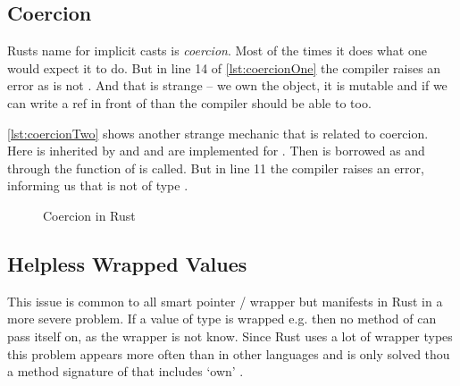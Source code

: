 \documentclass[thesis]{subfiles}
\begin{document}
  \subsection{Coercion}
    Rusts name for implicit casts is \emph{coercion}.
    Most of the times it does what one would expect it to do.
    But in line 14 of \autoref{lst:coercionOne} the compiler raises an error as \Foo is not .
    And that is strange -- we own the object, it is mutable and if we can write a ref in front of  than the compiler should be able to too.

    \autoref{lst:coercionTwo} shows another strange mechanic that is related to coercion.
    Here \A is inherited by \B and \B and \A are implemented for \Foo.
    Then  is borrowed as \B and through  the function \fun of \A is called.
    But in line 11 the compiler raises an error, informing us that  is not of type .

    \newsavebox{\coercionOne}
    \begin{lrbox}{\coercionOne}
      \begin{minipage}{.45\linewidth}
        
      \end{minipage}
    \end{lrbox}

    \newsavebox{\coercionTwo}
    \begin{lrbox}{\coercionTwo}
      \begin{minipage}{.45\linewidth}
        
      \end{minipage}
    \end{lrbox}

    \begin{figure}[ht]
      \captionsetup{type=lstlisting}
      \hfill%
      \caption{Coercion in Rust}\label{lst:coercion}
    \end{figure}

  \subsection{Helpless Wrapped Values}
    This issue is common to all smart pointer / wrapper but manifests in Rust in a more severe problem.
    If a value of type \T is wrapped e.g. \RcT then no method of \T can pass itself on, as the wrapper is not know.
    Since Rust uses a lot of wrapper types this problem appears more often than in other languages and is only solved thou a method signature of \T that includes `own' \RcT.
\end{document}
